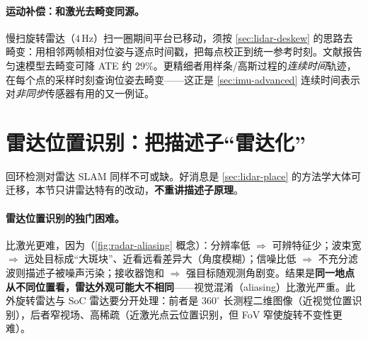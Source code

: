 \paragraph{运动补偿：和激光去畸变同源。}
慢扫旋转雷达（$4$\,Hz）扫一圈期间平台已移动，须按 \cref{sec:lidar-deskew} 的思路去畸变：用相邻两帧相对位姿与逐点时间戳，把每点校正到统一参考时刻。文献报告匀速模型去畸变可降 ATE 约 $29\%$\cite{carlone2026handbook}。更精细者用样条/高斯过程的\emph{连续时间}轨迹，在每个点的采样时刻查询位姿去畸变——这正是 \cref{sec:imu-advanced} 连续时间表示对\emph{非同步}传感器有用的又一例证。

\section{雷达位置识别：把描述子“雷达化”}
\label{sec:radar-place}

回环检测对雷达 SLAM 同样不可或缺。好消息是 \cref{sec:lidar-place} 的方法学大体可迁移，本节只讲雷达特有的改动，\textbf{不重讲描述子原理}。

\paragraph{雷达位置识别的独门困难。}
比激光更难，因为（\cref{fig:radar-aliasing} 概念）\cite{carlone2026handbook}：分辨率低 $\Rightarrow$ 可辨特征少；波束宽 $\Rightarrow$ 远处目标成“大斑块”、近看远看差异大（角度模糊）；信噪比低 $\Rightarrow$ 不充分滤波则描述子被噪声污染；接收器饱和 $\Rightarrow$ 强目标随观测角剧变。结果是\textbf{同一地点从不同位置看，雷达外观可能大不相同}——视觉混淆（aliasing）比激光严重。此外旋转雷达与 SoC 雷达要分开处理：前者是 $360^\circ$ 长测程二维图像（近视觉位置识别），后者窄视场、高稀疏（近激光点云位置识别，但 FoV 窄使旋转不变性更难）。

